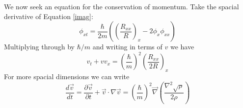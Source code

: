 \documentclass{article}
\begin{document}
We now seek an equation for the conservation of momentum. Take the spacial derivative of Equation \ref{imag}:
%
\begin{equation}
\phi_{xt} = \frac{\hbar}{2m}\left(\left(\frac{R_{xx}}{R}\right)_x - 2\phi_x\phi_{xx}\right)
\end{equation}
%
Multiplying through by $\hbar/m$ and writing in terms of $v$ we have
%
\begin{equation}
v_t + vv_x = \left(\frac{\hbar}{m}\right)^2\left(\frac{R_{xx}}{2R}\right)_x
\end{equation}
%
For more spacial dimensions we can write
%
\begin{equation}
\frac{d\vec v}{dt} 
  = \frac{\partial \vec v}{\partial t} + \vec v \cdot \nabla \vec v
  = \left(\frac{\hbar}{m}\right)^2 \vec \nabla \left(\frac{\nabla^2 \sqrt{\rho}}{2\rho}\right)
\end{equation}


\end{document}
